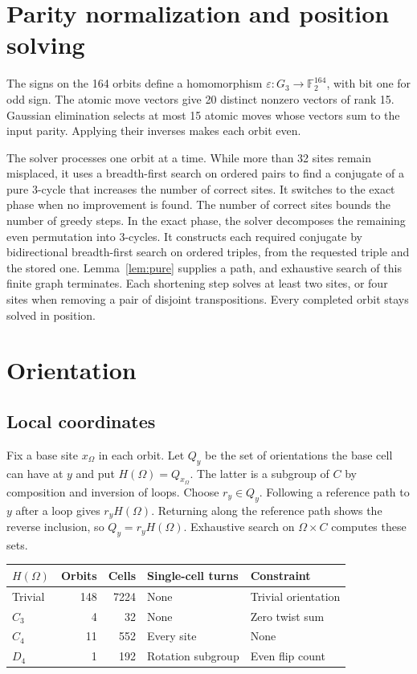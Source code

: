\documentclass[a4paper,11pt]{article}
\theoremstyle{definition}
\begin{document}
\section{Parity normalization and position solving}
The signs on the 164 orbits define a homomorphism
$\varepsilon:G_3\to\mathbb F_2^{164}$, with bit one for odd sign.
The atomic move vectors give 20 distinct nonzero vectors of rank 15.
Gaussian elimination selects at most 15 atomic moves whose vectors
sum to the input parity. Applying their inverses makes each orbit even.

The solver processes one orbit at a time. While more than 32 sites
remain misplaced, it uses a breadth-first search on ordered pairs
to find a conjugate of a pure 3-cycle that increases the number of
correct sites. It switches to the exact phase when no improvement is
found. The number of correct sites bounds the number of greedy steps.
In the exact phase, the solver decomposes the remaining even
permutation into 3-cycles. It constructs each required conjugate by
bidirectional breadth-first search on ordered triples, from the
requested triple and the stored one. Lemma~\ref{lem:pure} supplies
a path, and exhaustive search of this finite graph terminates.
Each shortening step solves at least two sites, or four sites when
removing a pair of disjoint transpositions. Every completed orbit
stays solved in position.

\section{Orientation}\label{sec:ori}
\subsection{Local coordinates}
Fix a base site $x_\Omega$ in each orbit. Let $Q_y$ be the set of
orientations the base cell can have at $y$ and put
$H(\Omega)=Q_{x_\Omega}$. The latter is a subgroup of $C$ by
composition and inversion of loops. Choose $r_y\in Q_y$. Following
a reference path to $y$ after a loop gives $r_yH(\Omega)$.
Returning along the reference path shows the reverse inclusion, so
$Q_y=r_yH(\Omega)$. Exhaustive search on $\Omega\times C$ computes
these sets.
\begin{center}
\begin{tabular}{lrrll}
\toprule
$H(\Omega)$ & Orbits & Cells & Single-cell turns & Constraint\\
\midrule
Trivial&148&7224& None & Trivial orientation\\
$C_3$&4&32& None & Zero twist sum\\
$C_4$&11&552& Every site & None\\
$D_4$&1&192& Rotation subgroup & Even flip count\\
\bottomrule
\end{tabular}
\end{center}
\end{document}
